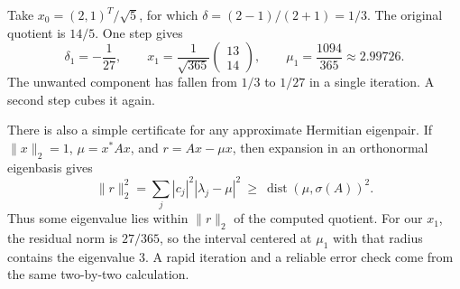 Take $x_0=(2,1)^T/\sqrt5$, for which $\delta=(2-1)/(2+1)=1/3$. The original quotient is $14/5$. One step gives
\[
 \delta_1=-\frac1{27},\qquad
 x_1=\frac1{\sqrt{365}}\begin{pmatrix}13\\14\end{pmatrix},
 \qquad
 \mu_1=\frac{1094}{365}\approx2.99726.
\]
The unwanted component has fallen from $1/3$ to $1/27$ in a single iteration. A second step cubes it again.

There is also a simple certificate for any approximate Hermitian eigenpair. If $\|x\|_2=1$, $\mu=x^*Ax$, and $r=Ax-\mu x$, then expansion in an orthonormal eigenbasis gives
\[
 \|r\|_2^2
   =\sum_j |c_j|^2|\lambda_j-\mu|^2
   \ \ge\ \operatorname{dist}(\mu,\sigma(A))^2.
\]
Thus some eigenvalue lies within $\|r\|_2$ of the computed quotient. For our $x_1$, the residual norm is $27/365$, so the interval centered at $\mu_1$ with that radius contains the eigenvalue $3$. A rapid iteration and a reliable error check come from the same two-by-two calculation.
